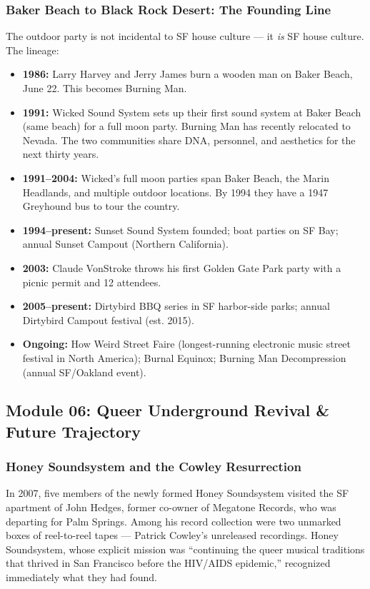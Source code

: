 \documentclass[11pt,letterpaper]{article}
\begin{document}
\subsubsection{Baker Beach to Black Rock Desert: The Founding Line}

The outdoor party is not incidental to SF house culture --- it \textit{is} SF house culture. The lineage:

\begin{itemize}[leftmargin=1.5em]
  \item \textbf{1986:} Larry Harvey and Jerry James burn a wooden man on Baker Beach, June 22. This becomes Burning Man.
  \item \textbf{1991:} Wicked Sound System sets up their first sound system at Baker Beach (same beach) for a full moon party. Burning Man has recently relocated to Nevada. The two communities share DNA, personnel, and aesthetics for the next thirty years.
  \item \textbf{1991--2004:} Wicked's full moon parties span Baker Beach, the Marin Headlands, and multiple outdoor locations. By 1994 they have a 1947 Greyhound bus to tour the country.
  \item \textbf{1994--present:} Sunset Sound System founded; boat parties on SF Bay; annual Sunset Campout (Northern California).
  \item \textbf{2003:} Claude VonStroke throws his first Golden Gate Park party with a picnic permit and 12 attendees.
  \item \textbf{2005--present:} Dirtybird BBQ series in SF harbor-side parks; annual Dirtybird Campout festival (est. 2015).
  \item \textbf{Ongoing:} How Weird Street Faire (longest-running electronic music street festival in North America); Burnal Equinox; Burning Man Decompression (annual SF/Oakland event).
\end{itemize}

\subsection{Module 06: Queer Underground Revival \& Future Trajectory}

\subsubsection{Honey Soundsystem and the Cowley Resurrection}

In 2007, five members of the newly formed Honey Soundsystem visited the SF apartment of John Hedges, former co-owner of Megatone Records, who was departing for Palm Springs. Among his record collection were two unmarked boxes of reel-to-reel tapes --- Patrick Cowley's unreleased recordings. Honey Soundsystem, whose explicit mission was ``continuing the queer musical traditions that thrived in San Francisco before the HIV/AIDS epidemic,'' recognized immediately what they had found.
\end{document}

